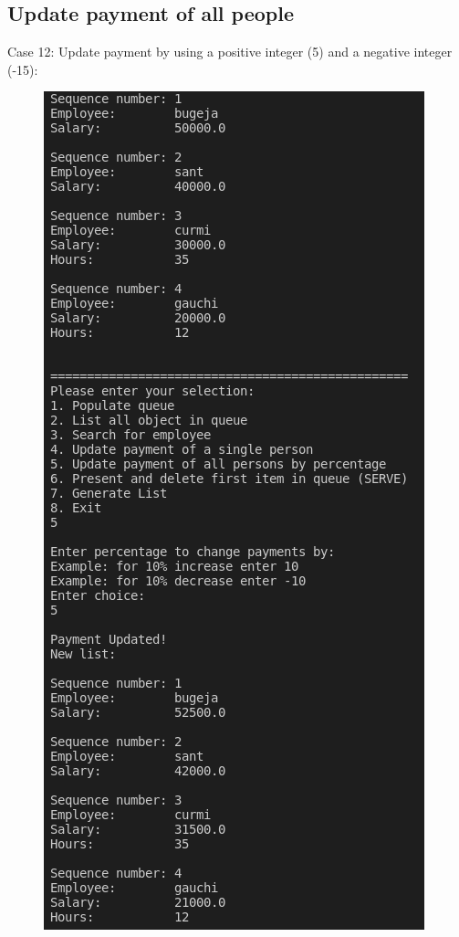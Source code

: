 \documentclass[12pt]{article}
\begin{document}
\newpage
\subsection{Update payment of all people}
Case 12: Update payment by using a positive integer (5) and a negative integer (-15):
\begin{figure}[h]
\centering
\includegraphics[scale=0.45]{Images/Testing 5/1.png}

\end{figure}
\end{document}
